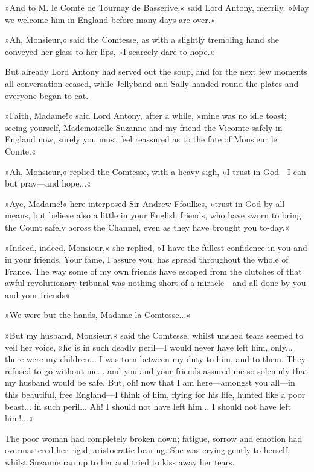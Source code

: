 »And to M. le Comte de Tournay de Basserive,« said Lord Antony, merrily. »May we welcome him in England before many days are over.«

»Ah, Monsieur,« said the Comtesse, as with a slightly trembling hand she conveyed her glass to her lips, »I scarcely dare to hope.«

But already Lord Antony had served out the soup, and for the next few moments all conversation ceased, while Jellyband and Sally handed round the plates and everyone began to eat.

»Faith, Madame!« said Lord Antony, after a while, »mine was no idle toast; seeing yourself, Mademoiselle Suzanne and my friend the Vicomte safely in England now, surely you must feel reassured as to the fate of Monsieur le Comte.«

»Ah, Monsieur,« replied the Comtesse, with a heavy sigh, »I trust in God\allowbreak---\allowbreak I can but pray\allowbreak---\allowbreak and hope...«

»Aye, Madame!« here interposed Sir Andrew Ffoulkes, »trust in God by all means, but believe also a little in your English friends, who have sworn to bring the Count safely across the Channel, even as they have brought you to-day.«

»Indeed, indeed, Monsieur,« she replied, »I have the fullest confidence in you and in your friends. Your fame, I assure you, has spread throughout the whole of France. The way some of my own friends have escaped from the clutches of that awful revolutionary tribunal was nothing short of a miracle\allowbreak---\allowbreak and all done by you and your  friends\longdash«

»We were but the hands, Madame la Comtesse...«

»But my husband, Monsieur,« said the Comtesse, whilst unshed tears seemed to veil her voice, »he is in such deadly peril\allowbreak---\allowbreak I would never have left him, only... there were my children... I was torn between my duty to him, and to them. They refused to go without me... and you and your friends assured me so solemnly that my husband would be safe. But, oh! now that I am here\allowbreak---\allowbreak amongst you all\allowbreak---\allowbreak in this beautiful, free England\allowbreak---\allowbreak I think of him, flying for his life, hunted like a poor beast... in such peril... Ah! I should not have left him... I should not have left him!...«

The poor woman had completely broken down; fatigue, sorrow and emotion had overmastered her rigid, aristocratic bearing. She was crying gently to herself, whilst Suzanne ran up to her and tried to kiss away her tears.

